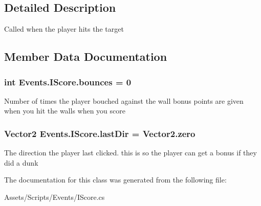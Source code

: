 \subsection{Detailed Description}
Called when the player hits the target 



\subsection{Member Data Documentation}
\subsubsection[{\texorpdfstring{bounces}{bounces}}]{\setlength{\rightskip}{0pt plus 5cm}int Events.\+I\+Score.\+bounces = 0}\hypertarget{class_events_1_1_i_score_a15ecb3ea31e60c28e8be9bbe8f183409}{}\label{class_events_1_1_i_score_a15ecb3ea31e60c28e8be9bbe8f183409}


Number of times the player bouched against the wall bonus points are given when you hit the walls when you score 

\subsubsection[{\texorpdfstring{last\+Dir}{lastDir}}]{\setlength{\rightskip}{0pt plus 5cm}Vector2 Events.\+I\+Score.\+last\+Dir = Vector2.\+zero}\hypertarget{class_events_1_1_i_score_a2ea657fdd7f72f26c59e92ee71d275d9}{}\label{class_events_1_1_i_score_a2ea657fdd7f72f26c59e92ee71d275d9}


The direction the player last clicked. this is so the player can get a bonus if they did a dunk 



The documentation for this class was generated from the following file\+:\begin{DoxyCompactItemize}
\item 
Assets/\+Scripts/\+Events/I\+Score.\+cs\end{DoxyCompactItemize}
